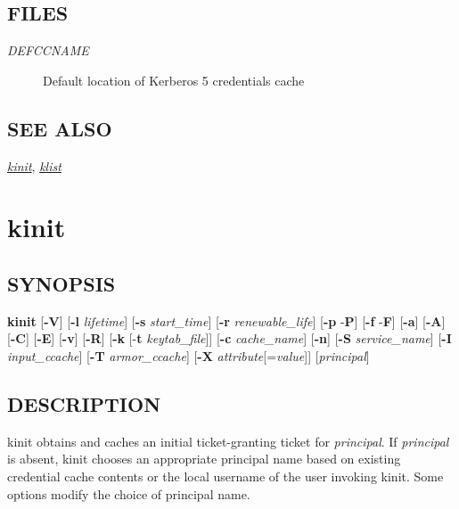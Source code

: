 \documentclass[letterpaper,10pt,english]{sphinxmanual}
\begin{document}
\subsection{FILES}
\label{user/user_commands/kdestroy:files}\begin{description}
\item[{\emph{DEFCCNAME}}] \leavevmode
Default location of Kerberos 5 credentials cache

\end{description}


\subsection{SEE ALSO}
\label{user/user_commands/kdestroy:see-also}
{\hyperref[user/user_commands/kinit:kinit-1]{\emph{kinit}}}, {\hyperref[user/user_commands/klist:klist-1]{\emph{klist}}}


\section{kinit}
\label{user/user_commands/kinit:kinit-1}\label{user/user_commands/kinit:kinit}\label{user/user_commands/kinit::doc}

\subsection{SYNOPSIS}
\label{user/user_commands/kinit:synopsis}
\textbf{kinit}
{[}\textbf{-V}{]}
{[}\textbf{-l} \emph{lifetime}{]}
{[}\textbf{-s} \emph{start\_time}{]}
{[}\textbf{-r} \emph{renewable\_life}{]}
{[}\textbf{-p} \textbar{} -\textbf{P}{]}
{[}\textbf{-f} \textbar{} -\textbf{F}{]}
{[}\textbf{-a}{]}
{[}\textbf{-A}{]}
{[}\textbf{-C}{]}
{[}\textbf{-E}{]}
{[}\textbf{-v}{]}
{[}\textbf{-R}{]}
{[}\textbf{-k} {[}-\textbf{t} \emph{keytab\_file}{]}{]}
{[}\textbf{-c} \emph{cache\_name}{]}
{[}\textbf{-n}{]}
{[}\textbf{-S} \emph{service\_name}{]}
{[}\textbf{-I} \emph{input\_ccache}{]}
{[}\textbf{-T} \emph{armor\_ccache}{]}
{[}\textbf{-X} \emph{attribute}{[}=\emph{value}{]}{]}
{[}\emph{principal}{]}


\subsection{DESCRIPTION}
\label{user/user_commands/kinit:description}
kinit obtains and caches an initial ticket-granting ticket for
\emph{principal}.  If \emph{principal} is absent, kinit chooses an appropriate
principal name based on existing credential cache contents or the
local username of the user invoking kinit.  Some options modify the
choice of principal name.
\end{document}
